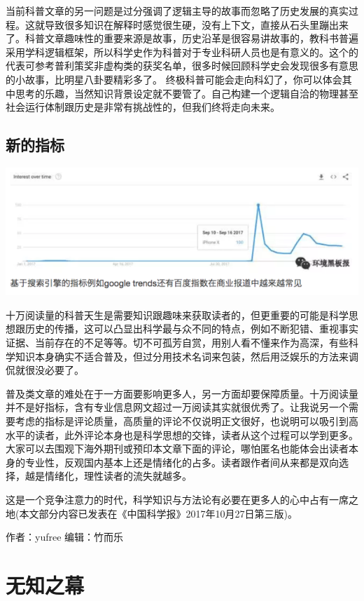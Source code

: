 \documentclass[
]{book}
\begin{document}
当前科普文章的另一问题是过分强调了逻辑主导的故事而忽略了历史发展的真实过程。这就导致很多知识在解释时感觉很生硬，没有上下文，直接从石头里蹦出来了。科普文章趣味性的重要来源是故事，历史沿革是很容易讲故事的，教科书普遍采用学科逻辑框架，所以科学史作为科普对于专业科研人员也是有意义的。这个的代表可参考普利策奖非虚构类的获奖名单，很多时候回顾科学史会发现很多有意思的小故事，比明星八卦要精彩多了。
终极科普可能会走向科幻了，你可以体会其中思考的乐趣，当然知识背景设定就不要管了。自己构建一个逻辑自洽的物理甚至社会运行体制跟历史是非常有挑战性的，但我们终将走向未来。

\hypertarget{ux65b0ux7684ux6307ux6807}{%
\subsection{新的指标}\label{ux65b0ux7684ux6307ux6807}}

\includegraphics[width=8.33in]{images/pops8}

十万阅读量的科普天生是需要知识跟趣味来获取读者的，但更重要的可能是科学思想跟历史的传播，这可以凸显出科学最与众不同的特点，例如不断犯错、重视事实证据、当前存在的不足等等。切不可孤芳自赏，用别人看不懂来作为高深，有些科学知识本身确实不适合普及，但过分用技术名词来包装，然后用泛娱乐的方法来调侃就很没必要了。

普及类文章的难处在于一方面要影响更多人，另一方面却要保障质量。十万阅读量并不是好指标，含有专业信息网文超过一万阅读其实就很优秀了。让我说另一个需要考虑的指标是评论质量，高质量的评论不仅说明正文很好，也说明可以吸引到高水平的读者，此外评论本身也是科学思想的交锋，读者从这个过程可以学到更多。大家可以去围观下海外期刊或预印本文章下面的评论，哪怕匿名也能体会出读者本身的专业性，反观国内基本上还是情绪化的占多。读者跟作者间从来都是双向选择，越是情绪化，理性读者的流失就越多。

这是一个竞争注意力的时代，科学知识与方法论有必要在更多人的心中占有一席之地(本文部分内容已发表在《中国科学报》2017年10月27日第三版)。

作者：yufree
编辑：竹而乐

\hypertarget{ux65e0ux77e5ux4e4bux5e55}{%
\section{无知之幕}\label{ux65e0ux77e5ux4e4bux5e55}}
\end{document}
